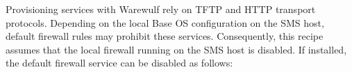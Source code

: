 Provisioning services with Warewulf rely on TFTP and HTTP transport protocols.
Depending on the local Base OS configuration on the SMS host, default firewall
rules may prohibit these services. Consequently, this recipe assumes that the local
firewall running on the SMS host is disabled. If installed, the default
firewall service can be disabled as follows:

